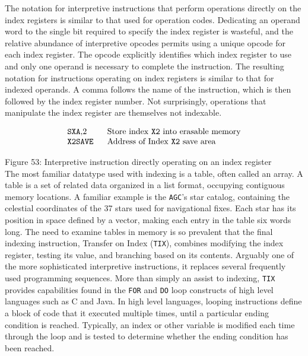 \documentclass[refcap, oxford]{ahsan}
\begin{document}
The notation for interpretive instructions that perform operations directly on the index registers is similar to that used for operation codes. Dedicating an operand word to the single bit required to specify the index register is wasteful, and the relative abundance of interpretive opcodes permits using a unique opcode for each index register. The opcode explicitly identifies which index register to use and only one operand is necessary to complete the instruction. The resulting notation for instructions operating on index registers is similar to that for indexed operands. A comma follows the name of the instruction, which is then followed by the index register number. Not surprisingly, operations that manipulate the index register are themselves not indexable.

$$
\begin{array}{ll}
\text { \texttt{SXA},2 } & \text { Store index \texttt{X2} into erasable memory } \\
\text { \texttt{X2SAVE} } & \text { Address of Index \texttt{X2} save area }
\end{array}
$$

Figure 53: Interpretive instruction directly operating on an index register\\
The most familiar datatype used with indexing is a table, often called an array. A table is a set of related data organized in a list format, occupying contiguous memory locations. A familiar example is the \texttt{AGC}'s star catalog, containing the celestial coordinates of the 37 stars used for navigational fixes. Each star has its position in space defined by a vector, making each entry in the table six words long. The need to examine tables in memory is so prevalent that the final indexing instruction, Transfer on Index (\texttt{TIX}), combines modifying the index register, testing its value, and branching based on its contents. Arguably one of the more sophisticated interpretive instructions, it replaces several frequently used programming sequences. More than simply an assist to indexing, \texttt{TIX} provides capabilities found in the \texttt{FOR} and \texttt{DO} loop constructs of high level languages such as C and Java. In high level languages, looping instructions define a block of code that it executed multiple times, until a particular ending condition is reached. Typically, an index or other variable is modified each time through the loop and is tested to determine whether the ending condition has been reached.
\end{document}
